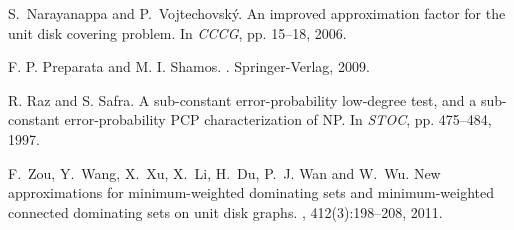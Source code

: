 \documentclass[a4paper,11pt]{article}
\begin{document}
\begin{thebibliography}{10}
S.~Narayanappa and P.~Vojtechovsk{\'y}.
\newblock An improved approximation factor for the unit disk covering problem.
\newblock In {\em CCCG}, pp. 15--18, 2006.

F. P. Preparata and M. I. Shamos.
. 
\newblock Springer-Verlag, 2009.

R. Raz and S. Safra.
\newblock A sub-constant error-probability low-degree test, and a
sub-constant error-probability PCP characterization of NP. 
\newblock In {\em STOC}, pp. 475--484, 1997.

F.~Zou, Y.~Wang, X.~Xu, X.~Li, H.~Du, P.~J. Wan and W.~Wu.
\newblock New approximations for minimum-weighted dominating sets and
  minimum-weighted connected dominating sets on unit disk graphs.
, 412(3):198--208, 2011.

\end{thebibliography}
\end{document}

